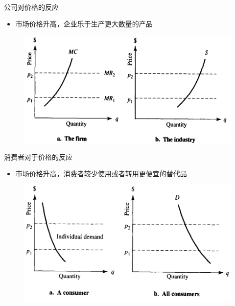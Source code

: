 \documentclass[UTF8]{ctexbeamer}
\begin{document}
\begin{frame}{公司对价格的反应}

  \begin{itemize}
  \item 市场价格升高，企业乐于生产更大数量的产品
  \end{itemize}
  
  \begin{figure}
    \centering
    \includegraphics[width=.7\textwidth]{ap.png}
  \end{figure}

\end{frame}

\begin{frame}{消费者对于价格的反应}

  \begin{itemize}
  \item 市场价格升高，消费者较少使用或者转用更便宜的替代品
  \end{itemize}

  \begin{figure}
    \centering
    \includegraphics[width=.7\textwidth]{cp.png}
  \end{figure}
  
\end{frame}
\end{document}
